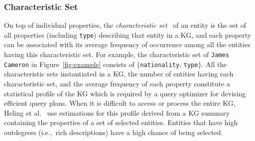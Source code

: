 \subsubsection{Characteristic Set}
On top of individual properties, the \emph{characteristic set}~\cite{DBLP:conf/esws/HelingA20} of an entity is the set of all properties (including \texttt{type}) describing that entity in a KG, and each property can be associated with its average frequency of occurrence among all the entities having this characteristic set. For example, the characteristic set of \texttt{James Cameron} in Figure~\ref{fig:example} consists of $\{$\texttt{nationality}, \texttt{type}$\}$. All the characteristic sets instantiated in a KG, the number of entities having each characteristic set, and the average frequency of each property constitute a statistical profile of the KG which is required by a query optimizer for devising efficient query plans. When it is difficult to access or process the entire KG, Heling et al.~ use estimations for this profile derived from a KG summary containing the properties of a set of selected entities. Entities that have high outdegrees (i.e.,~rich descriptions) have a high chance of being selected.

